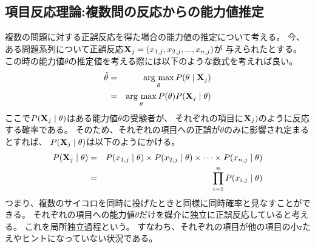 \documentclass[12pt]{jarticle}
\begin{document}
\subsection{項目反応理論:複数問の反応からの能力値推定}
複数の問題に対する正誤反応を得た場合の能力値の推定について考える。
今、
ある問題系列について正誤反応${\bf X}_j=(x_{1,j},x_{2,j},...,x_{n,j})$が
与えられたとする。
この時の能力値$\theta$の推定値を考える際には以下のような数式を考えれば良い。
\begin{eqnarray}
    \hat{\theta}&=& \mathop{\rm arg~max}\limits_{\theta} P(\theta \mid {\bf X}_j)\\
    &=& \mathop{\rm arg~max}\limits_{\theta} P(\theta)P({\bf X}_j \mid \theta)
\end{eqnarray}
ここで$P({\bf X}_j \mid \theta)$はある能力値$\theta$の受験者が、
それぞれの項目に${\bf X}_j)$のように反応する確率である。
そのため、それぞれの項目への正誤が$\theta$のみに影響され定まるとすれば、
$P({\bf X}_j \mid \theta)$は以下のようにかける。
\begin{eqnarray}
    P({\bf X}_j \mid \theta)&=&P(x_{1,j} \mid \theta)\times P(x_{2,j} \mid \theta) \times \cdots \times P(x_{n,j} \mid \theta)\\
    &=& \prod_{i=1}^n P(x_{i.j}\mid \theta)
\end{eqnarray}
つまり、複数のサイコロを同時に投げたときと同様に同時確率と見なすことができる。
それぞれの項目への能力値$\theta$だけを媒介に独立に正誤反応していると考える。
これを局所独立過程という。
すなわち、それぞれの項目が他の項目の小rたえやヒントになっていない状況である。
\end{document}
